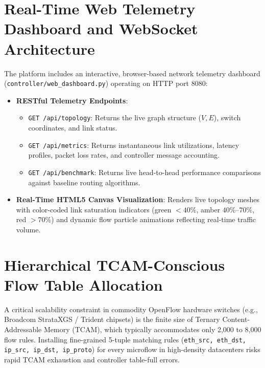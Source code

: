 \documentclass[12pt,a4paper,oneside]{report}
\begin{document}
\section{Real-Time Web Telemetry Dashboard and WebSocket Architecture}
The platform includes an interactive, browser-based network telemetry dashboard (\texttt{controller/web\_dashboard.py}) operating on HTTP port 8080:
\begin{itemize}
    \item \textbf{RESTful Telemetry Endpoints}:
    \begin{itemize}
        \item \texttt{GET /api/topology}: Returns the live graph structure ($V, E$), switch coordinates, and link status.
        \item \texttt{GET /api/metrics}: Returns instantaneous link utilizations, latency profiles, packet loss rates, and controller message accounting.
        \item \texttt{GET /api/benchmark}: Returns live head-to-head performance comparisons against baseline routing algorithms.
    \end{itemize}
    \item \textbf{Real-Time HTML5 Canvas Visualization}: Renders live topology meshes with color-coded link saturation indicators (green $< 40\%$, amber $40\%$--$70\%$, red $> 70\%$) and dynamic flow particle animations reflecting real-time traffic volume.
\end{itemize}

\section{Hierarchical TCAM-Conscious Flow Table Allocation}
\label{sec:tcam_conservation_architecture}
A critical scalability constraint in commodity OpenFlow hardware switches (e.g., Broadcom StrataXGS / Trident chipsets) is the finite size of Ternary Content-Addressable Memory (TCAM), which typically accommodates only 2,000 to 8,000 flow rules. Installing fine-grained 5-tuple matching rules (\texttt{eth\_src, eth\_dst, ip\_src, ip\_dst, ip\_proto}) for every microflow in high-density datacenters risks rapid TCAM exhaustion and controller table-full errors.
\end{document}
